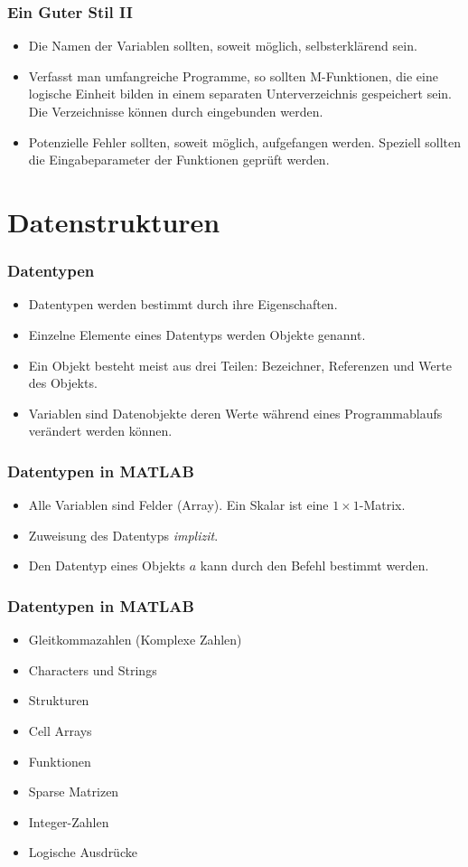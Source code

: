 \documentclass[hyperref={xetex}]{beamer}
\begin{document}
%
%
\begin{frame}[fragile]\frametitle{Ein Guter Stil II}
\begin{itemize}
\item Die Namen der Variablen sollten, soweit möglich, selbsterklärend
  sein.
\item Verfasst man umfangreiche Programme, so sollten M-Funktionen, die
  eine logische Einheit bilden in einem separaten Unterverzeichnis
  gespeichert sein. Die Verzeichnisse können durch 
  eingebunden werden. 
\item Potenzielle Fehler sollten, soweit möglich, aufgefangen
  werden. Speziell sollten die Eingabeparameter der Funktionen
  geprüft werden. 
\end{itemize}
\end{frame}


\section{Datenstrukturen}
%
%
%
\begin{frame}[fragile]\frametitle{Datentypen}
\begin{itemize}
\item \alert{Datentypen} werden bestimmt durch ihre Eigenschaften.
\item Einzelne Elemente eines Datentyps werden \alert{Objekte} genannt. 
\item Ein \alert{Objekt} besteht meist aus drei Teilen: \alert{Bezeichner}, \alert{Referenzen} 
und \alert{Werte} des Objekts.  
\item \alert{Variablen} sind Datenobjekte deren Werte w\"ahrend eines
Programmablaufs ver\"andert werden k\"onnen. 
\end{itemize}
\end{frame}
%
%
%
\begin{frame}[fragile]\frametitle{Datentypen in MATLAB}
\begin{itemize}
\item Alle Variablen sind Felder (Array). Ein Skalar ist eine $1 \times
1$-Matrix. 
\item Zuweisung des Datentyps {\it implizit}. 
\item Den Datentyp eines Objekts $a$ kann durch den Befehl  bestimmt werden.
\end{itemize}
\end{frame}
%
%
%
\begin{frame}[fragile]\frametitle{Datentypen in MATLAB}
\begin{itemize}
\item Gleitkommazahlen (Komplexe Zahlen)
\item Characters und Strings
\item Strukturen
\item Cell Arrays
\item Funktionen
\item Sparse Matrizen
\item Integer-Zahlen
\item Logische Ausdr\"ucke
\end{itemize}
\end{frame}
\end{document}
